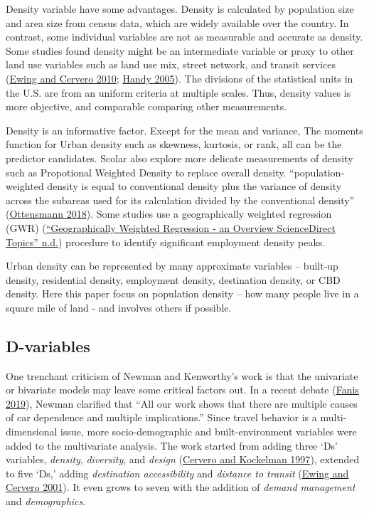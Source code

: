 \documentclass[
  11pt,
  openany]{memoir}
\begin{document}
Density variable have some advantages. Density is calculated by population size and area size from census data, which are widely available over the country. In contrast, some individual variables are not as measurable and accurate as density. Some studies found density might be an intermediate variable or proxy to other land use variables such as land use mix, street network, and transit services (\protect\hyperlink{ref-ewingTravelBuiltEnvironment2010}{Ewing and Cervero 2010}; \protect\hyperlink{ref-handyCriticalAssessmentLiterature2005}{Handy 2005}). The divisions of the statistical units in the U.S. are from an uniform criteria at multiple scales. Thus, density values is more objective, and comparable comparing other measurements.

Density is an informative factor. Except for the mean and variance, The moments function for Urban density such as skewness, kurtosis, or rank, all can be the predictor candidates. Scolar also explore more delicate measurements of density such as Propotional Weighted Density to replace overall density. ``population-weighted density is equal to conventional density plus the variance of density across the subareas used for its calculation divided by the conventional density'' (\protect\hyperlink{ref-ottensmannPopulationWeightedDensity2018}{Ottensmann 2018}). Some studies use a geographically weighted regression (GWR) (\protect\hyperlink{ref-GeographicallyWeightedRegression}{{``Geographically {Weighted Regression} - an Overview \textbar{} {ScienceDirect Topics}''} n.d.}) procedure to identify significant employment density peaks.

Urban density can be represented by many approximate variables -- built-up density, residential density, employment density, destination density, or CBD density. Here this paper focus on population density -- how many people live in a square mile of land - and involves others if possible.

\hypertarget{d-variables}{%
\subsection{D-variables}\label{d-variables}}

One trenchant criticism of Newman and Kenworthy's work is that the univariate or bivariate models may leave some critical factors out. In a recent debate (\protect\hyperlink{ref-fanisThreeStudiesThat2019}{Fanis 2019}), Newman clarified that ``All our work shows that there are multiple causes of car dependence and multiple implications.'' Since travel behavior is a multi-dimensional issue, more socio-demographic and built-environment variables were added to the multivariate analysis. The work started from adding three `Ds' variables, \emph{density}, \emph{diversity}, and \emph{design} (\protect\hyperlink{ref-cerveroTravelDemand3Ds1997}{Cervero and Kockelman 1997}), extended to five `Ds,' adding \emph{destination accessibility} and \emph{distance to transit} (\protect\hyperlink{ref-ewingTravelBuiltEnvironment2001}{Ewing and Cervero 2001}). It even grows to seven with the addition of \emph{demand management} and \emph{demographics}.
\end{document}
